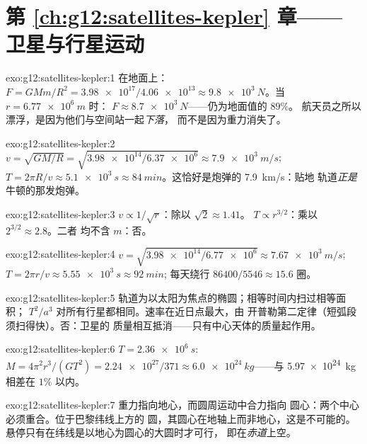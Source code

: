 \section*{第 \ref{ch:g12:satellites-kepler} 章——卫星与行星运动}

\begin{solution}{exo:g12:satellites-kepler:1}
在地面上：$F = GMm/R^2 = \num{3.98e17}/\num{4.06e13} \approx
\qty{9.8e3}{N}$。当 $r = \qty{6.77e6}{m}$ 时：
$F \approx \qty{8.7e3}{N}$——仍为地面值的 $89\%$。
航天员之所以漂浮，是因为他们与空间站一起\emph{下落}，
而不是因为重力消失了。
\end{solution}

\begin{solution}{exo:g12:satellites-kepler:2}
$v = \sqrt{GM/R} = \sqrt{\num{3.98e14}/\num{6.37e6}} \approx
\qty{7.9e3}{m/s}$; $T = 2\pi R/v \approx \qty{5.1e3}{s} \approx
\qty{84}{min}$。这恰好是炮弹的 \qty{7.9}{km/s}：贴地
轨道\emph{正是}牛顿的那发炮弹。
\end{solution}

\begin{solution}{exo:g12:satellites-kepler:3}
$v \propto 1/\sqrt{r}$：除以 $\sqrt 2 \approx 1.41$。
$T \propto r^{3/2}$：乘以 $2^{3/2} \approx 2.8$。二者
均不含 $m$：否。
\end{solution}

\begin{solution}{exo:g12:satellites-kepler:4}
$v = \sqrt{\num{3.98e14}/\num{6.77e6}} \approx \qty{7.67e3}{m/s}$;
$T = 2\pi r/v \approx \qty{5.55e3}{s} \approx \qty{92}{min}$;
每天绕行 $\num{86400}/5546 \approx 15.6$ 圈。
\end{solution}

\begin{solution}{exo:g12:satellites-kepler:5}
轨道为以太阳为焦点的椭圆；相等时间内扫过相等面积；
$T^2/a^3$ 对所有行星都相同。速率在近日点最大，由
开普勒第二定律（短弧段须扫得快）。否：卫星的
质量相互抵消——只有中心天体的质量起作用。
\end{solution}

\begin{solution}{exo:g12:satellites-kepler:6}
$T = \qty{2.36e6}{s}$: $M = 4\pi^2 r^3/(GT^2) =
\num{2.24e27}/371 \approx \qty{6.0e24}{kg}$——与
\qty{5.97e24}{kg} 相差在 $1\%$ 以内。
\end{solution}

\begin{solution}{exo:g12:satellites-kepler:7}
重力指向地心，而圆周运动中合力指向
圆心：两个中心必须重合。位于巴黎纬线上方的
圆，其圆心在地轴上而非地心，这是不可能的。
悬停只有在纬线是以地心为圆心的大圆时才可行，
即在\emph{赤道}上空。
\end{solution}

